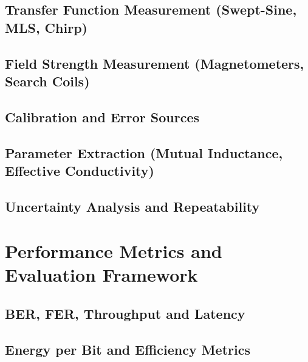 \subsection{Transfer Function Measurement (Swept-Sine, MLS, Chirp)}\label{subsec:transfer-measurement}

\subsection{Field Strength Measurement (Magnetometers, Search Coils)}\label{subsec:field-strength}

\subsection{Calibration and Error Sources}\label{subsec:calibration}

\subsection{Parameter Extraction (Mutual Inductance, Effective Conductivity)}\label{subsec:parameter-extraction}

\subsection{Uncertainty Analysis and Repeatability}\label{subsec:uncertainty}

\section{Performance Metrics and Evaluation Framework}\label{sec:performance-metrics}
\subsection{BER, FER, Throughput and Latency}\label{subsec:basic-metrics}

\subsection{Energy per Bit and Efficiency Metrics}\label{subsec:energy-metrics}

